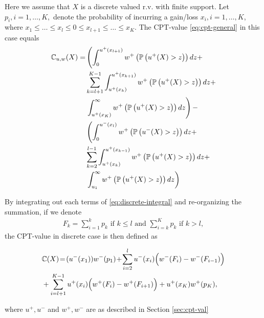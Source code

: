 Here we assume that $X$ is a discrete valued r.v. with finite support. 
Let $p_i, i=1,\ldots,K,$ denote the probability of incurring a gain/loss $x_i, i=1,\ldots,K$, where 
$x_1\le \ldots \le x_l \le 0 \le x_{l+1} \le \ldots \le x_K$.
The CPT-value \eqref{eq:cpt-general} in this case equals
\begin{align}
\label{eq:discrete-integral}
\mathbb{C}_{u,w}(X)  = &\left(\int_0^{u^+(x_{l+1})} w^+\left(\mathbb{P}\left( u^+(X)>z \right)\right) dz + \right.\nonumber \\
&\sum_{k=l+1}^{K-1}\int_{u^+(x_{k})}^{u^+(x_{k+1})} w^+\left(\mathbb{P}\left( u^+(X)>z \right)\right) dz + \nonumber\\
&\left.\int_{u^+(x_{K})}^\infty w^+\left(\mathbb{P}\left( u^+(X)>z \right)\right) dz\right)-\nonumber\\
&\left( \int_0^{u^-(x_l)} w^+\left(\mathbb{P}\left( u^-(X)>z \right)\right) dz + \right.\nonumber\\
&\sum_{k =2}^{l-1} \int_{u^+(x_{k})}^{u^+(x_{k-1})}w^+\left(\mathbb{P}\left( u^+(X)>z \right)\right) dz + \nonumber\\
&\left.\int_{u_1}^\infty w^+\left(\mathbb{P}\left( u^+(X)>z \right)\right) dz \right)
\end{align}

By integrating out each terms of \eqref{eq:discrete-integral} and re-organizing the summation, if we denote 
\begin{align}
\label{eq:Fk}
 F_k = 
   \sum_{i=1}^k p_k  \text{ if   } k \leq l \text{ and }
   \sum_{i=k}^K p_k  \text{ if  }  k > l,
\end{align}
the CPT-value in discrete case is then defined as  
\begin{small}
\begin{align*}
&\mathbb{C}(X) \!=\! (u^-(x_1)) w^-(p_1) 
\!+\!\sum_{i=2}^l u^-(x_i) \Big(w^-(F_i) - w^-(F_{i-1})\Big) \\
& + \sum_{i=l+1}^{K-1} u^+(x_i) \Big(w^+(F_i) - w^+(F_{i+1}) \Big)
 + u^+(x_K) w^+(p_K),
\end{align*} 
\end{small}
where $u^+, u^-$ and $w^+, w^-$ are as described in Section \ref{sec:cpt-val}

